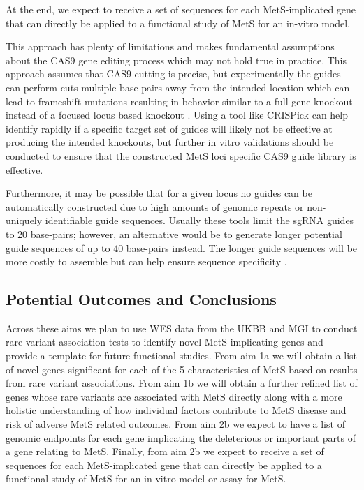 \documentclass[11pt]{article}
\begin{document}
At the end, we expect to receive a set of sequences for each MetS-implicated gene that can directly be applied to a functional study of MetS for an in-vitro model.

\noindent {}

This approach has plenty of limitations and makes fundamental assumptions about the CAS9 gene editing process which may not hold true in practice. This approach assumes that CAS9 cutting is precise, but experimentally the guides can perform cuts multiple base pairs away from the intended location which can lead to frameshift mutations resulting in behavior similar to a full gene knockout instead of a focused locus based knockout \cite{Ma2014-uc}. Using a tool like CRISPick can help identify rapidly if a specific target set of guides will likely not be effective at producing the intended knockouts, but further in vitro validations should be conducted to ensure that the constructed MetS loci specific CAS9 guide library is effective.

Furthermore, it may be possible that for a given locus no guides can be automatically constructed due to high amounts of genomic repeats or non-uniquely identifiable guide sequences. Usually these tools limit the sgRNA guides to 20 base-pairs; however, an alternative would be to generate longer potential guide sequences of up to 40 base-pairs instead. The longer guide sequences will be more costly to assemble but can help ensure sequence specificity \cite{Ma2014-uc}.

\subsection*{Potential Outcomes and Conclusions}

Across these aims we plan to use WES data from the UKBB and MGI to conduct rare-variant association tests to identify novel MetS implicating genes and provide a template for future functional studies. From aim 1a we will obtain a list of novel genes significant for each of the 5 characteristics of MetS based on results from rare variant associations. From aim 1b we will obtain a further refined list of genes whose rare variants are associated with MetS directly along with a more holistic understanding of how individual factors contribute to MetS disease and risk of adverse MetS related outcomes. From aim 2b we expect to have a list of genomic endpoints for each gene implicating the deleterious or important parts of a gene relating to MetS. Finally, from aim 2b we expect to receive a set of sequences for each MetS-implicated gene that can directly be applied to a functional study of MetS for an in-vitro model or assay for MetS.
\end{document}

